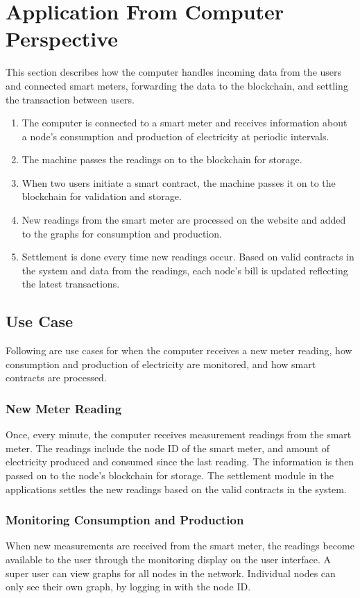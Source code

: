 \section{Application From Computer Perspective} \label{computer}
This section describes how the computer handles incoming data from the users and connected smart meters, forwarding the data to the blockchain, and settling the transaction between users.
\begin{enumerate}
\item The computer is connected to a smart meter and receives information about a node's consumption and production of electricity at periodic intervals. 
\item The machine passes the readings on to the blockchain for storage. 
\item When two users initiate a smart contract, the machine passes it on to the blockchain for validation and storage.
\item New readings from the smart meter are processed on the website and added to the graphs for consumption and production.
\item Settlement is done every time new readings occur. Based on valid contracts in the system and data from the readings, each node's bill is updated reflecting the latest transactions.
\end{enumerate}

\subsection{Use Case}
Following are use cases for when the computer receives a new meter reading, how consumption and production of electricity are monitored, and how smart contracts are processed. 
\subsubsection*{New Meter Reading}
Once, every minute, the computer receives measurement readings from the smart meter. The readings include the node ID of the smart meter, and amount of electricity produced and consumed since the last reading. The information is then passed on to the node's blockchain for storage. The settlement module in the applications settles the new readings based on the valid contracts in the system. 

\subsubsection*{Monitoring Consumption and Production}
When new measurements are received from the smart meter, the readings become available to the user through the monitoring display on the user interface. A super user can view graphs for all nodes in the network. Individual nodes can only see their own graph, by logging in with the node ID.

